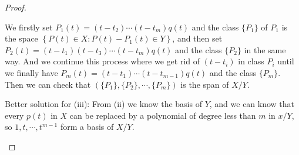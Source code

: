 \documentclass[11pt]{book}
\theoremstyle{definition}
\numberwithin{equation}{subsection}
\begin{document}
\begin{proof}
\begin{enumerate}[label=(\roman*)]
    We firstly set $P_1(t) = (t-t_2)\cdots(t-t_m)q(t)$ and the class $\{P_1\}$ of $P_1$ is the space $\left\{P(t)\in X: P(t) - P_1(t) \in Y \right\}$, and then set $P_2(t) = (t-t_1)(t-t_3)\cdots(t-t_m)q(t)$ and the class $\{P_2 \}$ in the same way. And we continue this process where we get rid of $(t-t_i)$ in class $P_i$ until we finally have $P_m(t) = (t-t_1)\cdots(t-t_{m-1})q(t)$ and the class $\{P_m \}$. Then we can check that $( \{P_1\}, \{P_2\}, \cdots, \{P_m\})$ is the span of $X/Y$.
    
    Better solution for (iii): From (ii) we know the basis of $Y$, and we can know that every $p(t)$ in $X$ can be replaced by a polynomial of degree less than $m$ in $x/Y$, so $1, t, \cdots, t^{m-1}$ form a basis of $X/Y$.
\end{enumerate}
\end{proof}

\medskip
\end{document}
